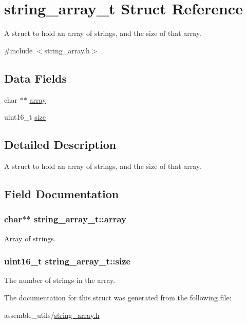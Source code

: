\hypertarget{structstring__array__t}{}\section{string\+\_\+array\+\_\+t Struct Reference}
\label{structstring__array__t}


A struct to hold an array of strings, and the size of that array.  




{\ttfamily \#include $<$string\+\_\+array.\+h$>$}

\subsection*{Data Fields}
\begin{DoxyCompactItemize}
\item 
char $\ast$$\ast$ \hyperlink{structstring__array__t_ac158e05caa61025cdb9f221183161337}{array}
\item 
uint16\+\_\+t \hyperlink{structstring__array__t_a9e9bbd01e9c1c02813d1afa94f57e391}{size}
\end{DoxyCompactItemize}


\subsection{Detailed Description}
A struct to hold an array of strings, and the size of that array. 

\subsection{Field Documentation}
\subsubsection[{\texorpdfstring{array}{array}}]{\setlength{\rightskip}{0pt plus 5cm}char$\ast$$\ast$ string\+\_\+array\+\_\+t\+::array}\hypertarget{structstring__array__t_ac158e05caa61025cdb9f221183161337}{}\label{structstring__array__t_ac158e05caa61025cdb9f221183161337}
Array of strings. 
\subsubsection[{\texorpdfstring{size}{size}}]{\setlength{\rightskip}{0pt plus 5cm}uint16\+\_\+t string\+\_\+array\+\_\+t\+::size}\hypertarget{structstring__array__t_a9e9bbd01e9c1c02813d1afa94f57e391}{}\label{structstring__array__t_a9e9bbd01e9c1c02813d1afa94f57e391}
The number of strings in the array. 

The documentation for this struct was generated from the following file\+:\begin{DoxyCompactItemize}
\item 
assemble\+\_\+utils/\hyperlink{string__array_8h}{string\+\_\+array.\+h}\end{DoxyCompactItemize}

